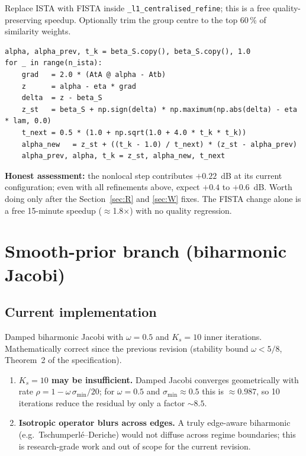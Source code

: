 \documentclass[11pt,a4paper]{article}
\begin{document}
\begin{fixbox}
Replace ISTA with FISTA inside \texttt{\_l1\_centralised\_refine}; this
is a free quality-preserving speedup. Optionally trim the group centre
to the top 60\,\% of similarity weights.
\end{fixbox}

\begin{lstlisting}[caption={FISTA replacement for the L1-centralised refinement loop.}]
alpha, alpha_prev, t_k = beta_S.copy(), beta_S.copy(), 1.0
for _ in range(n_ista):
    grad   = 2.0 * (AtA @ alpha - Atb)
    z      = alpha - eta * grad
    delta  = z - beta_S
    z_st   = beta_S + np.sign(delta) * np.maximum(np.abs(delta) - eta * lam, 0.0)
    t_next = 0.5 * (1.0 + np.sqrt(1.0 + 4.0 * t_k * t_k))
    alpha_new   = z_st + ((t_k - 1.0) / t_next) * (z_st - alpha_prev)
    alpha_prev, alpha, t_k = z_st, alpha_new, t_next
\end{lstlisting}

\begin{impactbox}
\textbf{Honest assessment:} the nonlocal step contributes $+0.22$~dB at
its current configuration; even with all refinements above, expect
$+0.4$ to $+0.6$~dB. Worth doing only after the Section~\ref{sec:R} and
\ref{sec:W} fixes. The FISTA change alone is a free 15-minute speedup
($\approx$1.8$\times$) with no quality regression.
\end{impactbox}

\section{Smooth-prior branch (biharmonic Jacobi)}\label{sec:smooth}

\subsection*{Current implementation}

Damped biharmonic Jacobi with $\omega = 0.5$ and $K_s = 10$ inner
iterations. Mathematically correct since the previous revision
(stability bound $\omega < 5/8$, Theorem~2 of the specification).

\begin{issuebox}
\begin{enumerate}[leftmargin=1.2em,itemsep=2pt]
    \item \textbf{$K_s = 10$ may be insufficient.} Damped Jacobi
    converges geometrically with rate $\rho = 1 - \omega\,
    \sigma_{\min}/20$; for $\omega = 0.5$ and $\sigma_{\min} \approx 0.5$
    this is $\approx 0.987$, so 10 iterations reduce the residual by only
    a factor $\sim 8.5$.
    \item \textbf{Isotropic operator blurs across edges.} A truly
    edge-aware biharmonic (e.g.\ Tschumperl\'e--Deriche) would not
    diffuse across regime boundaries; this is research-grade work and
    out of scope for the current revision.
\end{enumerate}
\end{issuebox}
\end{document}
